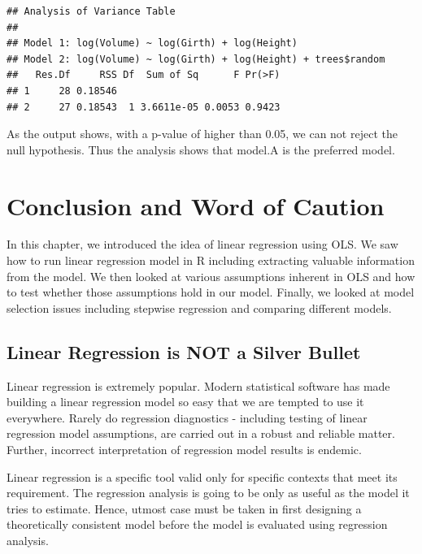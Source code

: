 \documentclass[10pt, letterpaper, twoside]{memoir}\usepackage{knitr}
\begin{document}
\begin{knitrout}
\color{fgcolor}\begin{kframe}
\begin{alltt}
\end{alltt}
\begin{verbatim}
## Analysis of Variance Table
## 
## Model 1: log(Volume) ~ log(Girth) + log(Height)
## Model 2: log(Volume) ~ log(Girth) + log(Height) + trees$random
##   Res.Df     RSS Df  Sum of Sq      F Pr(>F)
## 1     28 0.18546                            
## 2     27 0.18543  1 3.6611e-05 0.0053 0.9423
\end{verbatim}
\end{kframe}
\end{knitrout}

As the output shows, with a p-value of higher than 0.05, we can not reject the null hypothesis. Thus the analysis shows that model.A is the preferred model.


\section{Conclusion and Word of Caution}

In this chapter, we introduced the idea of linear regression using OLS. We saw how to run linear regression model in R including extracting valuable information from the model. We then looked at various assumptions inherent in  OLS and how to test whether those assumptions hold in our model. Finally, we looked at model selection issues including stepwise regression and comparing different models.

\subsection{Linear Regression is NOT a Silver Bullet}

Linear regression is extremely popular. Modern statistical software has made building a linear regression model so easy that we are tempted to use it everywhere. Rarely do regression diagnostics - including testing of linear regression model assumptions, are carried out in a robust and reliable matter. Further, incorrect interpretation of regression model results is endemic. 

Linear regression is a specific tool valid only for specific contexts that meet its requirement. The regression analysis is going to be only as useful as the model it tries to estimate. Hence, utmost case must be taken in first designing a theoretically consistent model before the model is evaluated using regression analysis.
\end{document}
